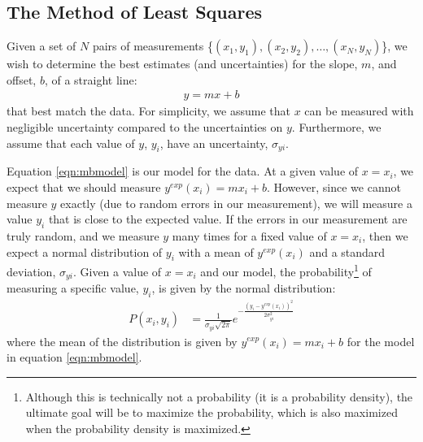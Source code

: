 
\subsection{The Method of Least Squares}
Given a set of $N$ pairs of measurements \{$(x_1,y_1), (x_2,y_2), \dots, (x_N,y_N)$\}, we wish to determine the best estimates (and uncertainties) for the slope, $m$, and offset, $b$, of a straight line:
\begin{align}
\label{eqn:mbmodel}
y=mx+b
\end{align}
that best match the data. For simplicity, we assume that $x$ can be measured with negligible uncertainty compared to the uncertainties on $y$. Furthermore, we assume that each value of $y$, $y_i$, have an uncertainty, $\sigma_{yi}$.

Equation \ref{eqn:mbmodel} is our model for the data. At a given value of $x=x_i$, we expect that we should measure $y^{exp}(x_i)=mx_i+b$. However, since we cannot measure $y$ exactly (due to random errors in our measurement), we will measure a value $y_i$ that is close to the expected value. If the errors in our measurement are truly random, and we measure $y$ many times for a fixed value of $x=x_i$, then we expect a normal distribution of $y_i$ with a mean of $y^{exp}(x_i)$ and a standard deviation, $\sigma_{yi}$. Given a value of $x=x_i$ and our model, the probability\footnote{Although this is technically not a probability (it is a probability density), the ultimate goal will be to maximize the probability, which is also maximized when the probability density is maximized.} of measuring a specific value, $y_i$, is given by the normal distribution:
\begin{align}
P(x_i,y_i)&=\frac{1}{\sigma_{yi}\sqrt{2\pi}}e^{-\frac{(y_i-y^{exp}(x_i))^2}{2\sigma_{yi}^2}}
\end{align}
where the mean of the distribution is given by $y^{exp}(x_i)=mx_i+b$ for the model in equation \ref{eqn:mbmodel}.

